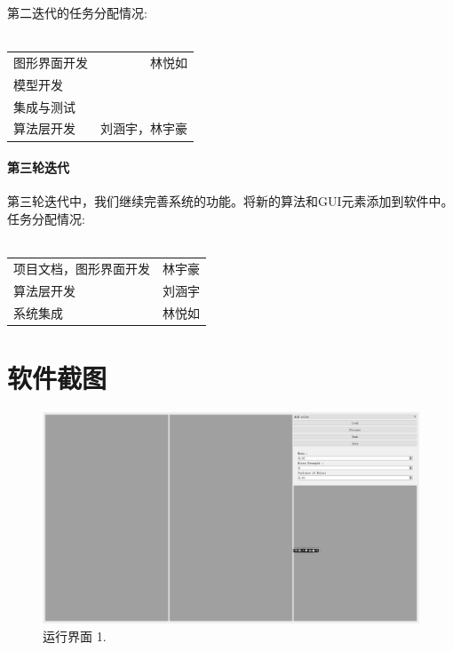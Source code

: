 \documentclass[14pt,a4paper]{article}
\begin{document}
\newpage
第二迭代的任务分配情况:\\\\
\begin{center}
\begin{tabular}{lr}
	图形界面开发  &林悦如 \\
	模型开发\\
	集成与测试	\\  
	算法层开发　&刘涵宇，林宇豪 \\
\end{tabular}
\end{center}

\paragraph*{第三轮迭代}
第三轮迭代中，我们继续完善系统的功能。将新的算法和GUI元素添加到软件中。\\
任务分配情况:\\\\
\begin{center}
\begin{tabular}{ll}
	项目文档，图形界面开发 &林宇豪\\  
	算法层开发　&刘涵宇\\
	系统集成	&林悦如	
\end{tabular}
\end{center}

\newpage
\section{软件截图}
\begin{figure}[h]
\begin{center}
\includegraphics[width=\textwidth]{image/1} 
\caption{运行界面 1.}
\end{center}
\end{figure}
\end{document}
